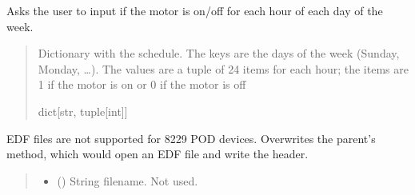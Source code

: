 \documentclass[letterpaper,10pt,english]{sphinxmanual}
\begin{document}
\begin{fulllineitems}
\begin{fulllineitems}
\label{\detokenize{Setup.SetupOneDevice:Setup.SetupOneDevice.Setup_8229.Setup8229._GetScheduleForWeek}}
\pysigstartsignatures
{}
\pysigstopsignatures
\sphinxAtStartPar
Asks the user to input if the motor is on/off for each hour of each             day of the week.
\begin{quote}\begin{description}
\sphinxAtStartPar
Dictionary with the schedule. The keys are the                 days of the week (Sunday, Monday, …). The values are a tuple of 24                 items for each hour; the items are 1 if the motor is on or 0 if the                 motor is off

\sphinxAtStartPar
dict{[}str, tuple{[}int{]}{]}

\end{description}\end{quote}

\end{fulllineitems}


\begin{fulllineitems}
\label{\detokenize{Setup.SetupOneDevice:Setup.SetupOneDevice.Setup_8229.Setup8229._OpenSaveFile_EDF}}
\pysigstartsignatures
{}
\pysigstopsignatures
\sphinxAtStartPar
EDF files are not supported for 8229 POD devices. Overwrites the         parent’s method, which would open an EDF file and write the header.
\begin{quote}\begin{description}
\begin{itemize}
\item {} 
\sphinxAtStartPar
{} () \textendash{} String filename. Not used.


\end{itemize}
\end{description}
\end{quote}
\end{fulllineitems}
\end{fulllineitems}
\end{document}
